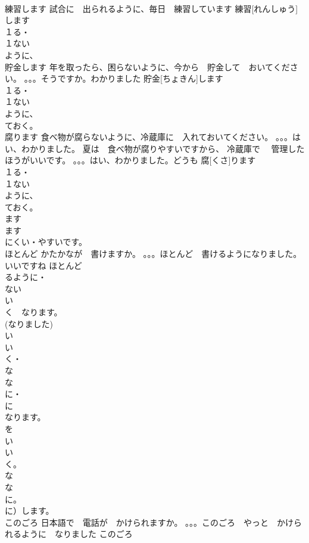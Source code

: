 \documentclass[8pt]{extreport}
\begin{document}
\begin{CJK}{UTF8}{min}
\\	練習します	試合に　出られるように、毎日　練習しています	練習[れんしゅう]します			
\\	１る・
\\	１ない
\\	ように、
\\	貯金します	年を取ったら、困らないように、今から　貯金して　おいてください。 。。。そうですか。わかりました	貯金[ちょきん]します			
\\	１る・
\\	１ない
\\	ように、
\\	ておく。
\\	腐ります	食べ物が腐らないように、冷蔵庫に　入れておいてください。 。。。はい、わかりました。 夏は　食べ物が腐りやすいですから、 冷蔵庫で　 管理したほうがいいです。 。。。はい、わかりました。どうも	腐[くさ]ります				
\\	１る・
\\	１ない
\\	ように、
\\	ておく。
\\	ます　
\\	ます
\\	にくい・やすいです。
\\	ほとんど	かたかなが　書けますか。 。。。ほとんど　書けるようになりました。 いいですね	ほとんど			
\\	るように・
\\	ない
\\	い　
\\	く　なります。
\\	(なりました) 
\\	い
\\	い
\\	く・
\\	な
\\	な
\\	に・
\\	に　
\\	なります。
\\	を
\\	い
\\	い
\\	く。
\\	な
\\	な
\\	に。
\\	に）します。
\\	このごろ	日本語で　電話が　かけられますか。 。。。このごろ　やっと　かけられるように　なりました	このごろ			

\end{CJK}
\end{document}
